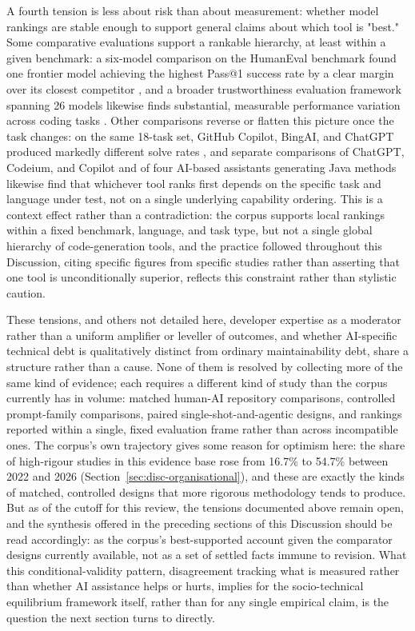 A fourth tension is less about risk than about measurement: whether model rankings are stable enough to support general claims about which tool is "best." Some comparative evaluations support a rankable hierarchy, at least within a given benchmark: a six-model comparison on the HumanEval benchmark found one frontier model achieving the highest Pass@1 success rate by a clear margin over its closest competitor \cite{bayram_comparative_2025}, and a broader trustworthiness evaluation framework spanning 26 models likewise finds substantial, measurable performance variation across coding tasks \cite{gao_treat_2025}. Other comparisons reverse or flatten this picture once the task changes: on the same 18-task set, GitHub Copilot, BingAI, and ChatGPT produced markedly different solve rates \cite{idrisov_program_2024}, and separate comparisons of ChatGPT, Codeium, and Copilot \cite{ovi_benchmarking_2024} and of four AI-based assistants generating Java methods \cite{corso_generating_2024} likewise find that whichever tool ranks first depends on the specific task and language under test, not on a single underlying capability ordering. This is a context effect rather than a contradiction: the corpus supports local rankings within a fixed benchmark, language, and task type, but not a single global hierarchy of code-generation tools, and the practice followed throughout this Discussion, citing specific figures from specific studies rather than asserting that one tool is unconditionally superior, reflects this constraint rather than stylistic caution.

These tensions, and others not detailed here, developer expertise as a moderator rather than a uniform amplifier or leveller of outcomes, and whether AI-specific technical debt is qualitatively distinct from ordinary maintainability debt, share a structure rather than a cause. None of them is resolved by collecting more of the same kind of evidence; each requires a different kind of study than the corpus currently has in volume: matched human-AI repository comparisons, controlled prompt-family comparisons, paired single-shot-and-agentic designs, and rankings reported within a single, fixed evaluation frame rather than across incompatible ones. The corpus's own trajectory gives some reason for optimism here: the share of high-rigour studies in this evidence base rose from 16.7\% to 54.7\% between 2022 and 2026 (Section~\ref{sec:disc-organisational}), and these are exactly the kinds of matched, controlled designs that more rigorous methodology tends to produce. But as of the cutoff for this review, the tensions documented above remain open, and the synthesis offered in the preceding sections of this Discussion should be read accordingly: as the corpus's best-supported account given the comparator designs currently available, not as a set of settled facts immune to revision. What this conditional-validity pattern, disagreement tracking what is measured rather than whether AI assistance helps or hurts, implies for the socio-technical equilibrium framework itself, rather than for any single empirical claim, is the question the next section turns to directly.

